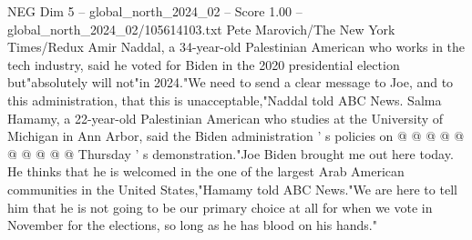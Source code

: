 \begin{textsample}{NEG Dim 5 – global\_north\_2024\_02 – Score 1.00 – global\_north\_2024\_02/105614103.txt}
Pete Marovich/The New York Times/Redux Amir Naddal, a 34-year-old Palestinian American who works in the tech industry, said he voted for Biden in the 2020 presidential election but"absolutely will not"in 2024."We need to send a clear message to Joe, and to this administration, that this is unacceptable,"Naddal told ABC News.
Salma Hamamy, a 22-year-old Palestinian American who studies at the University of Michigan in Ann Arbor, said the Biden administration ' s policies on @ @ @ @ @ @ @ @ @ @ Thursday ' s demonstration."Joe Biden brought me out here today.
He thinks that he is welcomed in the one of the largest Arab American communities in the United States,"Hamamy told ABC News."We are here to tell him that he is not going to be our primary choice at all for when we vote in November for the elections, so long as he has blood on his hands."

\end{textsample}
